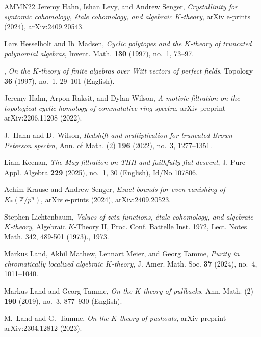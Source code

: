 \documentclass[english,10pt]{amsart}
\theoremstyle{definition}
\numberwithin{equation}{section}
\begin{document}
{\begin{thebibliography}{AMMN22}
Jeremy {Hahn}, Ishan {Levy}, and Andrew {Senger}, \emph{{Crystallinity for syntomic cohomology, {\'e}tale cohomology, and algebraic $K$-theory}}, arXiv e-prints (2024), arXiv:2409.20543.

Lars Hesselholt and Ib~Madsen, \emph{Cyclic polytopes and the {$K$}-theory of truncated polynomial algebras}, Invent. Math. \textbf{130} (1997), no.~1, 73--97. 

\bysame, \emph{On the {{\(K\)}}-theory of finite algebras over {Witt} vectors of perfect fields}, Topology \textbf{36} (1997), no.~1, 29--101 (English).

Jeremy Hahn, Arpon Raksit, and Dylan Wilson, \emph{A motivic filtration on the topological cyclic homology of commutative ring spectra}, arXiv preprint arXiv:2206.11208 (2022).

J.~Hahn and D.~Wilson, \emph{Redshift and multiplication for truncated {B}rown-{P}eterson spectra}, Ann. of Math. (2) \textbf{196} (2022), no.~3, 1277--1351. 

Liam Keenan, \emph{The {May} filtration on {THH} and faithfully flat descent}, J. Pure Appl. Algebra \textbf{229} (2025), no.~1, 30 (English), Id/No 107806.

Achim {Krause} and Andrew {Senger}, \emph{{Exact bounds for even vanishing of $K_* (\mathbb{Z}/p^n)$}}, arXiv e-prints (2024), arXiv:2409.20523.

Stephen Lichtenbaum, \emph{Values of zeta-functions, {\'e}tale cohomology, and algebraic {{\(K\)}}-theory}, Algebraic {{\(K\)}}-{Theory} {II}, {Proc}. {Conf}. {Battelle} {Inst}. 1972, {Lect}. {Notes} {Math}. 342, 489-501 (1973)., 1973.

Markus Land, Akhil Mathew, Lennart Meier, and Georg Tamme, \emph{Purity in chromatically localized algebraic {$K$}-theory}, J. Amer. Math. Soc. \textbf{37} (2024), no.~4, 1011--1040. 

Markus Land and Georg Tamme, \emph{On the {{\(K\)}}-theory of pullbacks}, Ann. Math. (2) \textbf{190} (2019), no.~3, 877--930 (English).

M.~Land and G.~Tamme, \emph{On the {$ K $}-theory of pushouts}, arXiv preprint arXiv:2304.12812 (2023).


\end{thebibliography}}
\end{document}
